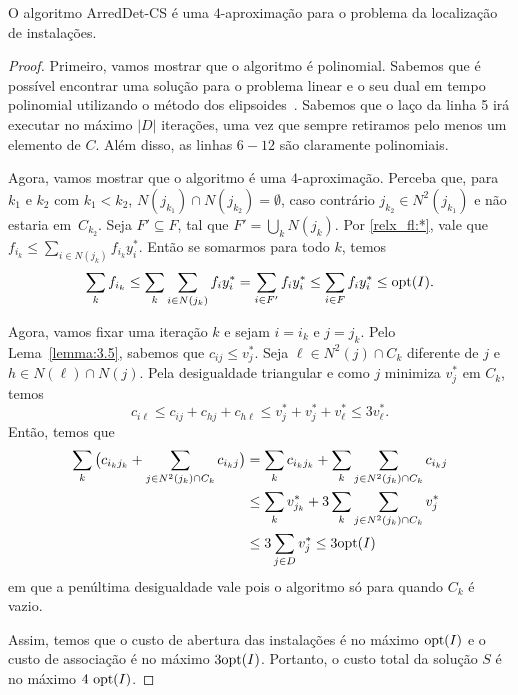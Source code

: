 \begin{theorem}
    O algoritmo {\sc ArredDet-CS} é uma $4$-aproximação para o problema da localização de instalações.
\end{theorem}
\begin{proof}
    Primeiro, vamos mostrar que o algoritmo é polinomial. Sabemos que é possível encontrar uma solução para o problema linear e o seu dual em tempo polinomial utilizando o método dos elipsoides~\cite{Kha79}. Sabemos que o laço da linha 5 irá executar no máximo $|D|$ iterações, uma vez que sempre retiramos pelo menos um elemento de $C$. Além disso, as linhas $6-12$ são claramente polinomiais.

    Agora, vamos mostrar que o algoritmo é uma $4$-aproximação.
    Perceba que, para $k_1$ e $k_2$ com $k_1 < k_2$, $N(j_{k_1})\cap N(j_{k_2}) = \emptyset$, caso contrário $j_{k_2} \in N^2(j_{k_1})$ e não estaria em~$C_{k_2}$.
    Seja $F' \subseteq F$, tal que $F' = \bigcup_k N(j_k)$.
    Por \eqref{relx_fl:*}, vale que $f_{i_k} \leq \sum_{i \in N(j_k)}f_{i_k}y^*_{i}$. Então se somarmos para todo $k$, temos
    \[ \sum_kf_{i_k} \leq \sum_k \sum_{i \in N(j_k)}f_{i}y^*_{i} = \sum_{i \in F'}f_{i}y^*_{i} \leq \sum_{i \in F}f_{i}y^*_{i} \leq \mathrm{opt}(I).\]

    Agora, vamos fixar uma iteração $k$ e sejam $i = i_k$ e $j = j_k$. Pelo Lema~\ref{lemma:3.5}, sabemos que $c_{ij} \leq v^*_j$. Seja $\ell \in N^2(j) \cap C_k$ diferente de $j$ e $h \in N(\ell) \cap N(j)$. Pela desigualdade triangular e como $j$ minimiza $v^*_j$ em $C_k$, temos
    \[ c_{i\ell} \leq c_{ij} + c_{hj} + c_{h\ell} \leq v_j^* + v_j^* + v_{\ell}^* \leq 3 v_{\ell}^*.
        \]
    Então, temos que
    \begin{subequations}
        \begin{align*}
        \sum_{k} {\big (}c_{i_kj_k} + \sum_{j \in N^2(j_k)\cap C_k} c_{i_kj} {\big )} &= \sum_{k} c_{i_kj_k} + \sum_{k}\sum_{j \in N^2(j_k)\cap C_k} c_{i_kj}\\
        &\leq \sum_k v^*_{j_k} + 3\sum_{k}\sum_{j \in N^2(j_k)\cap C_k} v^*_j\\
        &\leq 3 \sum_{j \in D}v^*_j \leq 3\mathrm{opt}(I)           
        \end{align*}
    \end{subequations}
    em que a penúltima desigualdade vale pois o algoritmo só para quando $C_k$ é vazio.

    Assim, temos que o custo de abertura das instalações é no máximo $\mathrm{opt}(I)$ e o custo de associação é no máximo $3\mathrm{opt}(I)$. Portanto, o custo total da solução $S$ é no máximo $4~\mathrm{opt}(I)$.
\end{proof}